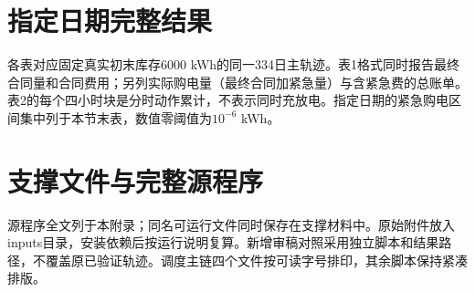 \section{指定日期完整结果}
各表对应固定真实初末库存6000 kWh的同一334日主轨迹。表1格式同时报告最终合同量和合同费用；另列实际购电量（最终合同加紧急量）与含紧急费的总账单。表2的每个四小时块是分时动作累计，不表示同时充放电。指定日期的紧急购电区间集中列于本节末表，数值零阈值为$10^{-6}$ kWh。

\clearpage
\clearpage
\clearpage


\clearpage\section{支撑文件与完整源程序}
源程序全文列于本附录；同名可运行文件同时保存在支撑材料中。原始附件放入inputs目录，安装依赖后按运行说明复算。新增审稿对照采用独立脚本和结果路径，不覆盖原已验证轨迹。调度主链四个文件按可读字号排印，其余脚本保持紧凑排版。



